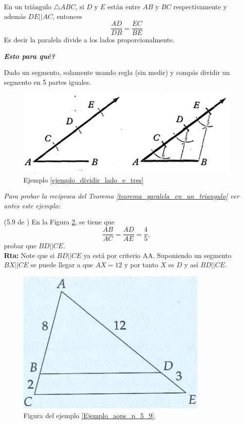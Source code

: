 \begin{theorem}
	\label{teorema_paralela_en_un_triangulo}En un triángulo $\triangle ABC$, si $D$ y $E$ están entre $AB$ y $BC$ respectivamente y además $DE||AC$, entonces
	 \begin{equation*}
		\frac{AD}{DB}=\frac{EC}{BE}
	 \end{equation*}	 	
	Es decir la paralela divide a los lados proporcionalmente. 
\end{theorem}

\textbf{\textit{Esto para qué?}}
\begin{ejemplo}
	\label{ejemplo_dividir_lado_e_tres}
	Dado un segmento, solamente usando regla (sin medir) y compás dividir un segmento en 5 partes iguales.
	
	\begin{figure}[H]
		\centering
		\includegraphics[width=0.7\linewidth]{Geometria/imgs/clemens_dividir_lado_en_tres}
		\caption{Ejemplo \ref{ejemplo_dividir_lado_e_tres}}
		\label{clemens_dividir_lado_en_tres}
	\end{figure}
	
\end{ejemplo}

\textit{Para probar la reciproca del Teorema \ref{teorema_paralela_en_un_triangulo} ver antes este ejemplo:}

\begin{ejemplo}\label{Ejemplo_aops_p_5_9}
	(5.9 de \cite{Aops_Geometria}) En la Figura \ref{aops_geo_p_5_9}, se tiene que 
	\[
		\frac{AB}{AC} = \frac{AD}{AE} = \frac{4}{5},
	\]
	probar que $BD||CE$.\\
	\textbf{Rta:} Note que si $BD||CE$ ya está por criterio AA. Suponiendo un segmento $BX||CE$ se puede llegar a que $AX=12$ y por tanto $X$ es $D$ y así $BD||CE$.
	
	
	\begin{figure}[H]
		\centering
		\includegraphics[width=0.5\linewidth]{Geometria/imgs/aops_geo_p_5_9}
		\caption{Figura del ejemplo \ref{Ejemplo_aops_p_5_9}.}
		\label{aops_geo_p_5_9}
	\end{figure}
\end{ejemplo}







